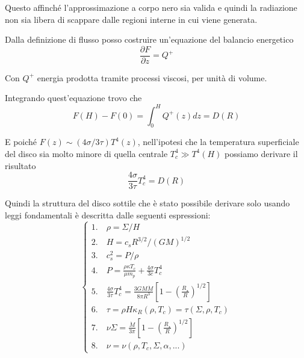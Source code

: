 \documentclass[a4paperbi]{article}
\begin{document}
	Questo affinché l'approssimazione a corpo nero sia valida e quindi la radiazione non sia libera di scappare dalle regioni interne in cui viene generata.
	
	Dalla definizione di flusso posso costruire un'equazione del balancio energetico
	\begin{equation}
		\frac{\partial F}{\partial z}=Q^+
	\end{equation}

	Con $Q^+$ energia prodotta tramite processi viscosi, per unità di volume.
	
	Integrando quest'equazione trovo che
	\begin{equation}
		F(H)-F(0)=\int_0^HQ^+(z)dz=D(R)
	\end{equation}

	E poiché $F(z)\sim(4\sigma/3\tau)T^4(z)$, nell'ipotesi che la temperatura superficiale del disco sia molto minore di quella centrale $T_c^4\gg T^4(H)$
	possiamo derivare il risultato
	\begin{equation}
		\frac{4\sigma}{3\tau}T^4_c=D(R)
	\end{equation}
	
	Quindi la struttura del disco sottile che è stato possibile derivare solo usando leggi fondamentali è descritta dalle seguenti espressioni:
	\begin{equation}
	\begin{cases}
		1.\quad \rho=\Sigma/H\\
		2.\quad H=c_sR^{3/2}/(GM)^{1/2}\\
		3.\quad c_s^2=P/\rho\\
		4.\quad P=\frac{\rho\kappa T_c}{\mu m_p}+\frac{4\sigma}{3c}T_c^4\\
		5.\quad \frac{4\sigma}{3\tau}T^4_c=\frac{3GM\dot{M}}{8\pi R^3}\left[1-\left(\frac{R_{\star}}{R}\right)^{1/2}\right]\\
		6.\quad \tau=\rho H\kappa_R(\rho,T_c)=\tau(\Sigma,\rho,T_c)\\
		7.\quad \nu\Sigma=\frac{\dot{M}}{3\pi}\left[1-\left(\frac{R_{\star}}{R}\right)^{1/2}\right]\\
		8.\quad \nu=\nu(\rho,T_c,\Sigma,\alpha,...)		
	\end{cases}
	\end{equation}
		
\end{document}
